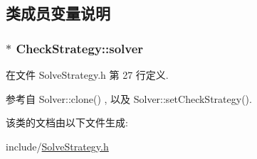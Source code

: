 \subsection{类成员变量说明}
\subsubsection[{\texorpdfstring{solver}{solver}}]{$\ast$ Check\+Strategy\+::solver}\hypertarget{classCheckStrategy_a2adc667c9f5fe299ef7fa0a01781448b}{}\label{classCheckStrategy_a2adc667c9f5fe299ef7fa0a01781448b}


在文件 Solve\+Strategy.\+h 第 27 行定义.



参考自 Solver\+::clone() , 以及 Solver\+::set\+Check\+Strategy().



该类的文档由以下文件生成\+:\begin{DoxyCompactItemize}
\item 
include/\hyperlink{SolveStrategy_8h}{Solve\+Strategy.\+h}\end{DoxyCompactItemize}
